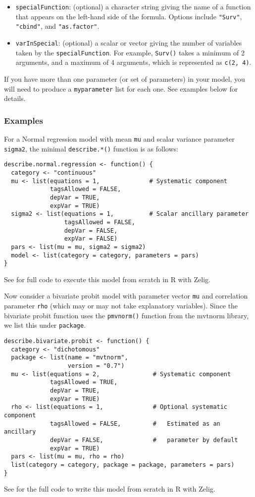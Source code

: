 \begin{itemize}
\begin{itemize}
\item {\tt specialFunction}: (optional) a character string giving the
name of a function that appears on the left-hand side of the formula.
Options include {\tt "Surv"}, {\tt "cbind"}, and {\tt "as.factor"}. 

\item {\tt varInSpecial}: (optional) a scalar or vector giving the
number of variables taken by the {\tt specialFunction}.  For example,
{\tt Surv()} takes a minimum of 2 arguments, and a maximum of 4
arguments, which is represented as {\tt c(2, 4)}.   

\end{itemize}
If you have more than one parameter (or set of parameters) in
your model, you will need to produce a {\tt myparameter} list for each
one.  See examples below for details.  
\end{itemize}

\subsubsection{Examples}
For a Normal regression model with mean {\tt mu} and scalar variance
parameter {\tt sigma2}, the minimal {\tt describe.*()} function is as
follows:  
\begin{verbatim}
describe.normal.regression <- function() {
  category <- "continuous"
  mu <- list(equations = 1,              # Systematic component
             tagsAllowed = FALSE, 
             depVar = TRUE, 
             expVar = TRUE)
  sigma2 <- list(equations = 1,          # Scalar ancillary parameter
                 tagsAllowed = FALSE, 
                 depVar = FALSE, 
                 expVar = FALSE)
  pars <- list(mu = mu, sigma2 = sigma2)
  model <- list(category = category, parameters = pars)
}
\end{verbatim}
See  for full code to execute this model from
scratch in R with Zelig.  

Now consider a bivariate probit model with parameter vector {\tt mu} and
correlation parameter {\tt rho} (which may or may not take explanatory
variables).  Since the bivariate probit function uses the {\tt pmvnorm()} 
function from the mvtnorm library, we list this under {\tt package}.   
\begin{verbatim}
describe.bivariate.probit <- function() {
  category <- "dichotomous"
  package <- list(name = "mvtnorm", 
                  version = "0.7")
  mu <- list(equations = 2,               # Systematic component 
             tagsAllowed = TRUE,          
             depVar = TRUE, 
             expVar = TRUE) 
  rho <- list(equations = 1,              # Optional systematic component
             tagsAllowed = FALSE,         #   Estimated as an ancillary
             depVar = FALSE,              #   parameter by default
             expVar = TRUE) 
  pars <- list(mu = mu, rho = rho)
  list(category = category, package = package, parameters = pars)
}
\end{verbatim}  
See  for the full code to write this model from
scratch in R with Zelig. 

